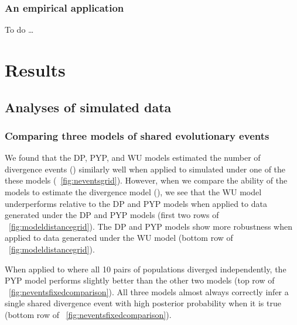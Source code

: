 \documentclass[letterpaper,12pt]{article}
\begin{document}
\subsubsection{An empirical application}

To do \ldots

\section{Results}

\subsection{Analyses of simulated data}

\subsubsection{Comparing three models of shared evolutionary events}

We found that the DP, PYP, and WU models estimated the number of divergence
events (\nevents) similarly well when applied to \datasets simulated under one
of the these models (\fig~\ref{fig:neventsgrid}).
However, when we compare the ability of the models to estimate
the divergence model (\etimesets), we see that the WU
model underperforms relative to the DP and PYP models when applied
to data generated under the DP and PYP models
(first two rows of \fig~\ref{fig:modeldistancegrid}).
The DP and PYP models show more robustness when applied to
data generated under the WU model
(bottom row of \fig~\ref{fig:modeldistancegrid}).

When applied to \datasets where all 10 pairs of populations diverged
independently, the PYP model performs slightly better than the other two models
(top row of \fig~\ref{fig:neventsfixedcomparison}).
All three models almost always correctly infer a single shared divergence event
with high posterior probability when it is true
(bottom row of \fig~\ref{fig:neventsfixedcomparison}).
\end{document}
